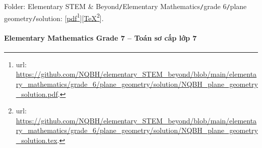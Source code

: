 \documentclass[12pt]{article}
\begin{document}
\begin{itemize}
	Folder: {\sf Elementary STEM \& Beyond{\tt/}Elementary Mathematics{\tt/}grade 6{\tt/}plane geometry{\tt/}solution}: [\href{https://github.com/NQBH/elementary_STEM_beyond/blob/main/elementary_mathematics/grade_6/plane_geometry/solution/NQBH_plane_geometry_solution.pdf}{pdf}\footnote{{\sc url}: \url{https://github.com/NQBH/elementary_STEM_beyond/blob/main/elementary_mathematics/grade_6/plane_geometry/solution/NQBH_plane_geometry_solution.pdf}.}][\href{https://github.com/NQBH/elementary_STEM_beyond/blob/main/elementary_mathematics/grade_6/plane_geometry/solution/NQBH_plane_geometry_solution.tex}{\TeX}\footnote{{\sc url}: \url{https://github.com/NQBH/elementary_STEM_beyond/blob/main/elementary_mathematics/grade_6/plane_geometry/solution/NQBH_plane_geometry_solution.tex}.}].
\end{itemize}

\paragraph{Elementary Mathematics Grade 7 -- Toán sơ cấp lớp 7}
\end{document}

